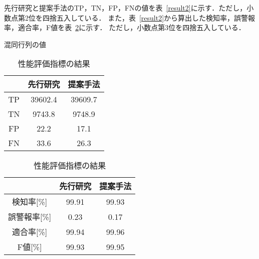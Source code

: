   先行研究と提案手法のTP，TN，FP，FNの値を表~\ref{result2}に示す．ただし，小数点第2位を四捨五入している．
また，表~\ref{result2}から算出した検知率，誤警報率，適合率，F値を表~\ref{result3}に示す．
ただし，小数点第3位を四捨五入している．
\begin{table}[tb]
  \centering
  \begin{minipage}{0.45\textwidth}  %
      \centering
      \caption{混同行列の値}  %
      \begin{tabular}{|c|c|c|}  %
          \hline  %
          ~ &先行研究 & 提案手法\\  %
          \hline  %
          TP & 39602.4 & 39609.7\\  %
          \hline  %
          TN & 9743.8 & 9748.9\\  %
          \hline  %
          FP & 22.2 & 17.1\\  %
          \hline  %
          FN & 33.6 & 26.3\\  %
          \hline  %
      \end{tabular}
      \label{result2}  %
  \end{minipage} \hspace{1cm}  %
  \begin{minipage}{0.45\textwidth}  %
      \centering
      \caption{性能評価指標の結果}  %
      \begin{tabular}{|c|c|c|}  %
          \hline  %
          ~ &先行研究 & 提案手法\\  %
          \hline  %
          検知率[\%] & 99.91 & 99.93\\  %
          \hline  %
          誤警報率[\%] & 0.23 & 0.17\\  %
          \hline  %
          適合率[\%] & 99.94 & 99.96\\  %
          \hline  %
          F値[\%] & 99.93 & 99.95\\  %
          \hline  %
      \end{tabular}
      \label{result3}  %
  \end{minipage}
\end{table}
